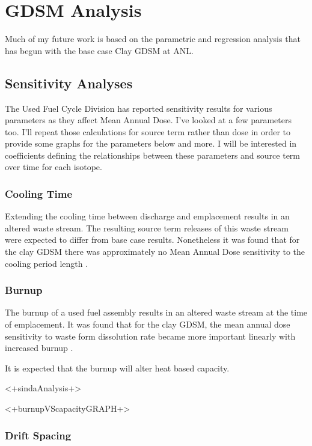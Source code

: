 \section{GDSM Analysis}

Much of my future work is based on the parametric and regression analysis that
has begun with the base case Clay \gls{GDSM} at \gls{ANL}.

\subsection{Sensitivity Analyses}

The Used Fuel Cycle Division has reported sensitivity results for various 
parameters as they affect Mean Annual Dose. I've looked at a 
few parameters too. I'll repeat those calculations for source term rather than 
dose in order to provide some graphs for the parameters below and more. I will 
be interested in coefficients defining the relationships between these 
parameters and source term over time for each isotope. 

\subsubsection{Cooling Time}

Extending the cooling time between discharge and emplacement results
in an altered waste stream. The resulting source term releases
of this waste stream were expected to differ from base case results. 
Nonetheless it was found that for the clay \gls{GDSM} there was approximately 
no Mean Annual Dose sensitivity to the cooling period length 
\cite{clayton_generic_2011}.

\subsubsection{Burnup}

The burnup of a used fuel assembly results in an altered waste stream at the 
time of emplacement. It was found that for the clay \gls{GDSM}, the mean 
annual dose sensitivity to waste form dissolution rate became more important 
linearly with increased burnup \cite{clayton_generic_2011}.

It is expected that the burnup will alter heat based capacity. 

<+sindaAnalysis+>

<+burnupVScapacityGRAPH+>


\subsubsection{Drift Spacing}

